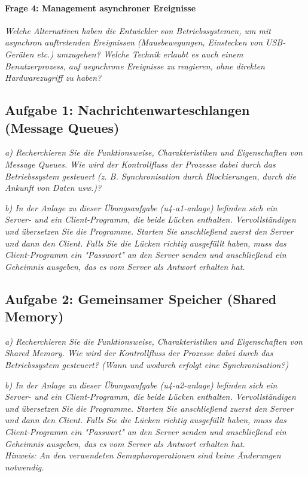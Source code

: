 \documentclass[a4paper]{article}
\begin{document}
\vspace{10mm}
\paragraph{Frage 4: Management asynchroner Ereignisse}
\textit{Welche Alternativen haben die Entwickler von Betriebssystemen, um mit asynchron auftretenden
    Ereignissen (Mausbewegungen, Einstecken von USB-Geräten etc.) umzugehen? Welche Technik
    erlaubt es auch einem Benutzerprozess, auf asynchrone Ereignisse zu reagieren, ohne direkten
    Hardwarezugriff zu haben?}

\subsection{Aufgabe 1: Nachrichtenwarteschlangen (Message Queues)}
\textit{a) Recherchieren Sie die Funktionsweise, Charakteristiken und Eigenschaften von Message Queues. Wie wird der Kontrollfluss der Prozesse dabei durch das Betriebssystem gesteuert (z. B. Synchronisation durch Blockierungen, durch die Ankunft von Daten usw.)?}
\vspace{10mm}

\textit{b) In der Anlage zu dieser Übungsaufgabe (u4-a1-anlage) befinden sich ein Server- und ein Client-Programm, die beide Lücken enthalten. Vervollständigen und übersetzen Sie die Programme. Starten Sie anschließend zuerst den Server und dann den Client. Falls Sie die Lücken richtig ausgefüllt haben, muss das Client-Programm ein "Passwort" an den Server senden und anschließend ein Geheimnis ausgeben, das es vom Server als Antwort erhalten hat.}
\vspace{10mm}

\subsection{Aufgabe 2: Gemeinsamer Speicher (Shared Memory)}
\textit{a) Recherchieren Sie die Funktionsweise, Charakteristiken und Eigenschaften von Shared Memory. Wie wird der Kontrollfluss der Prozesse dabei durch das Betriebssystem gesteuert? (Wann und wodurch erfolgt eine Synchronisation?)}
\vspace{10mm}

\textit{b) In der Anlage zu dieser Übungsaufgabe (u4-a2-anlage) befinden sich ein Server- und ein Client-Programm, die beide Lücken enthalten. Vervollständigen und übersetzen Sie die Programme. Starten Sie anschließend zuerst den Server und dann den Client. Falls Sie die Lücken richtig ausgefüllt haben, muss das Client-Programm ein "Passwort" an den Server senden und anschließend ein Geheimnis ausgeben, das es vom Server als Antwort erhalten hat.\\
    Hinweis: An den verwendeten Semaphoroperationen sind keine Änderungen notwendig.}
\vspace{10mm}
\end{document}
